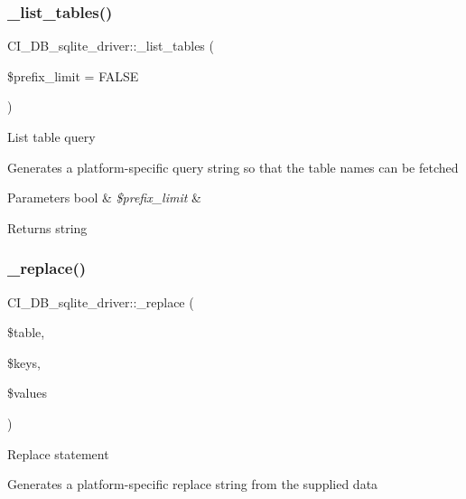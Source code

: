 \subsubsection{\texorpdfstring{\+\_\+list\+\_\+tables()}{\_list\_tables()}}
{\footnotesize\ttfamily C\+I\+\_\+\+D\+B\+\_\+sqlite\+\_\+driver\+::\+\_\+list\+\_\+tables (\begin{DoxyParamCaption}\item[{}]{\$prefix\+\_\+limit = {\ttfamily FALSE} }\end{DoxyParamCaption})\hspace{0.3cm}{\ttfamily [protected]}}

List table query

Generates a platform-\/specific query string so that the table names can be fetched


\begin{DoxyParams}[1]{Parameters}
bool & {\em \$prefix\+\_\+limit} & \\
\hline
\end{DoxyParams}
\begin{DoxyReturn}{Returns}
string 
\end{DoxyReturn}
\mbox{\label{class_c_i___d_b__sqlite__driver_ad639b31f8b26b35a96be7e5304ea772a}} 
\subsubsection{\texorpdfstring{\+\_\+replace()}{\_replace()}}
{\footnotesize\ttfamily C\+I\+\_\+\+D\+B\+\_\+sqlite\+\_\+driver\+::\+\_\+replace (\begin{DoxyParamCaption}\item[{}]{\$table,  }\item[{}]{\$keys,  }\item[{}]{\$values }\end{DoxyParamCaption})\hspace{0.3cm}{\ttfamily [protected]}}

Replace statement

Generates a platform-\/specific replace string from the supplied data


